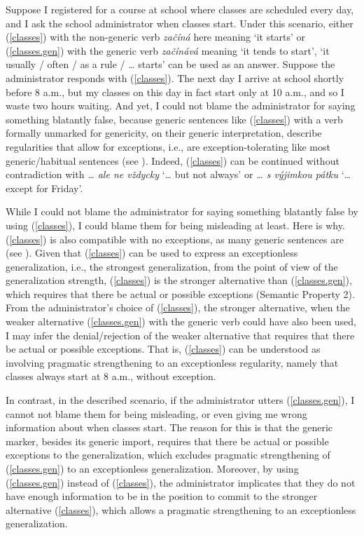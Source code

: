 \documentclass[output=paper,colorlinks,citecolor=brown]{langscibook}
\begin{document}
\noindent Suppose I registered for a course at school where classes are scheduled every day, and
I ask the school administrator when classes start.
Under this scenario, either (\ref{classes}) with the non-generic verb \textit{začíná} here meaning `it starts' or (\ref{classes.gen}) with the generic verb
\textit{začínává} meaning
`it tends to start', `it usually / often / as a rule / {\dots} starts' can be used as an answer.
Suppose the administrator responds with (\ref{classes}). The
next day I arrive at school shortly before
8 a.m., but my classes on this day in fact
start only at 10 a.m., and so I
waste two hours waiting. And yet, I could not blame
the administrator for saying something blatantly false,
because generic sentences like (\ref{classes}) with a verb formally unmarked for genericity, on their generic interpretation, describe regularities that
allow for exceptions, i.e., are exception-tolerating like most generic/habitual sentences (see ).
Indeed, (\ref{classes}) can be continued without contradiction with  \textit{{\dots} ale ne vždycky} `{\dots} but not always' or
\textit{{\dots} s výjimkou pátku} `{\dots} except for Friday'.

While I could not blame
the administrator for saying something blatantly false by using (\ref{classes}), I could blame them for being misleading at least.
Here is why.  (\ref{classes}) is also compatible with no exceptions, as many generic sentences are (see ).
Given that (\ref{classes}) can be used to express an exceptionless generalization, i.e.,
the strongest generalization,
from the point of view of the generalization strength, (\ref{classes})
is the stronger alternative than
(\ref{classes.gen}), which requires that there be actual or possible exceptions (Semantic Property 2).
From the administrator's choice of (\ref{classes}),
the stronger alternative,
when the weaker alternative (\ref{classes.gen})
with the generic verb could have also been used, I may infer the denial/rejection of the weaker alternative that requires that
there be actual or possible exceptions.
That is, (\ref{classes}) can be understood as involving pragmatic strengthening to an exceptionless regularity, namely that classes always start at 8 a.m., without exception.

In contrast, in the described scenario,
if the administrator utters (\ref{classes.gen}),
I cannot not blame them
for being misleading, or even
giving me wrong information about when classes start. The reason for this is that the generic marker, besides its generic import, requires that there be actual or possible exceptions to the generalization, which excludes
pragmatic strengthening of (\ref{classes.gen}) to an exceptionless generalization. Moreover, by using (\ref{classes.gen}) instead of
(\ref{classes}), the administrator
implicates that they do not have enough information to be in the position to commit to the stronger alternative (\ref{classes}), which allows a pragmatic strengthening to an exceptionless generalization.
\end{document}
